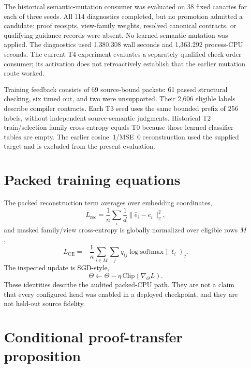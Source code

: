 \documentclass{article}
\begin{document}
The historical semantic-mutation consumer was evaluated on 38 fixed canaries for each of three seeds. All 114 diagnostics completed, but no promotion admitted a candidate: proof receipts, view-family weights, resolved canonical contracts, or qualifying guidance records were absent. No learned semantic mutation was applied. The diagnostics used 1,380.308 wall seconds and 1,363.292 process-CPU seconds. The current T4 experiment evaluates a separately qualified check-order consumer; its activation does not retroactively establish that the earlier mutation route worked.

Training feedback consists of 69 source-bound packets: 61 passed structural checking, six timed out, and two were unsupported. Their 2,606 eligible labels describe compiler contracts. Each T3 seed uses the same bounded prefix of 256 labels, without independent source-semantic judgments. Historical T2 train/selection family cross-entropy equals T0 because those learned classifier tables are empty. The earlier cosine~1/MSE~0 reconstruction used the supplied target and is excluded from the present evaluation.

\section{Packed training equations}
\label{app:packed}
The packed reconstruction term averages over embedding coordinates,
\begin{equation}
L_{\mathrm{rec}}=\frac1n\sum_i\frac1d\|\hat e_i-e_i\|_2^2,
\label{eq:rec}
\end{equation}
and masked family/view cross-entropy is globally normalized over eligible rows $M$,
\begin{equation}
L_{\mathrm{CE}}=-\frac1n\sum_{i\in M}\sum_j q_{ij}\log\mathrm{softmax}(\ell_i)_j.
\label{eq:ce}
\end{equation}
The inspected update is SGD-style,
\begin{equation}
\Theta\leftarrow\Theta-\eta\,\mathrm{Clip}(\nabla_\Theta L).
\label{eq:sgd}
\end{equation}
These identities describe the audited packed-CPU path. They are not a claim that every configured head was enabled in a deployed checkpoint, and they are not held-out source fidelity.

\section{Conditional proof-transfer proposition}
\label{app:prop}
\end{document}
